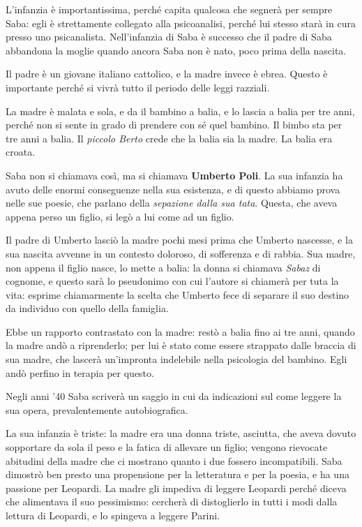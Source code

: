 L’infanzia è importantissima, perché capita qualcosa che segnerà per sempre Saba: egli è strettamente collegato alla psicoanalisi, perché lui stesso starà in cura presso uno psicanalista.
Nell’infanzia di Saba è successo che il padre di Saba abbandona la moglie quando ancora Saba non è nato, poco prima della nascita. 

Il padre è un giovane italiano cattolico, e la madre invece è ebrea. Questo è importante perché si vivrà tutto il periodo delle leggi razziali.

La madre è malata e sola, e da il bambino a balia, e lo lascia a balia per tre anni, perché non si sente in grado di prendere con sé quel bambino. Il bimbo sta per tre anni a balia.
Il \textit{piccolo Berto} crede che la balia sia la madre. La balia era croata.

Saba non si chiamava così, ma si chiamava \textbf{Umberto Poli}. La sua infanzia ha avuto delle enormi conseguenze nella sua esistenza, e di questo abbiamo prova nelle sue poesie, che parlano della \textit{sepazione dalla sua tata}.
Questa, che aveva appena perso un figlio, si legò a lui come ad un figlio.

Il padre di Umberto lasciò la madre pochi mesi prima che Umberto nascesse, e la sua nascita avvenne in un contesto doloroso, di sofferenza e di rabbia.
Sua madre, non appena il figlio nasce, lo mette a balia: la donna si chiamava \textit{Sabaz} di cognome, e questo sarà lo pseudonimo con cui l'autore si chiamerà per tuta la vita: esprime chiamarmente la scelta che Umberto fece di separare il suo destino da individuo con quello della famiglia.

Ebbe un rapporto contrastato con la madre: restò a balia fino ai tre anni, quando la madre andò a riprenderlo; per lui è stato come essere strappato dalle braccia di sua madre, che lascerà un'impronta indelebile nella psicologia del bambino. Egli andò perfino in terapia per questo.

Negli anni '40 Saba scriverà un saggio in cui da indicazioni sul come leggere la sua opera, prevalentemente autobiografica.

La sua infanzia è triste: la madre era una donna triste, asciutta, che aveva dovuto sopportare da sola il peso e la fatica di allevare un figlio; vengono rievocate abitudini della madre che ci mostrano quanto i due fossero incompatibili. Saba dimostrò ben presto una propensione per la letteratura e per la poesia, e ha una passione per Leopardi. La madre gli impediva di leggere Leopardi perché diceva che alimentava il suo pessimismo: cercherà di distoglierlo in tutti i modi dalla lettura di Leopardi, e lo spingeva a leggere Parini.


